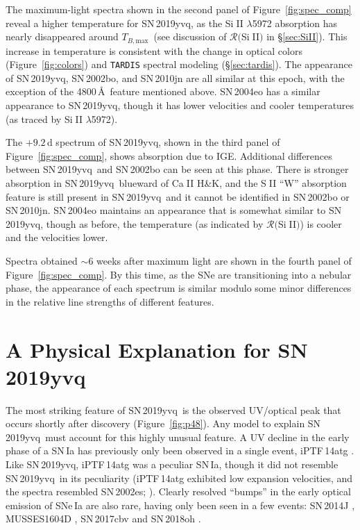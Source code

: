 \documentclass[twocolumn]{aastex63}
\def\ion#1#2{#1$\;${\footnotesize\rm{#2}}\relax}
\newcommand{\tbmax}{$T_{B,\mathrm{max}}$}
\newcommand{\RSiII}{$\mathcal{R}($\ion{Si}{II}$)$}
\newcommand{\sn}{SN\,2019yvq}
\begin{document}
The maximum-light spectra shown in the second panel of
Figure~\ref{fig:spec_comp} reveal a higher temperature for \sn, as the
\ion{Si}{II} $\lambda$5972 absorption has nearly disappeared around
\tbmax\ (see discussion of $\mathcal{R}($\ion{Si}{II}$)$ in \S\ref{sec:SiII}).
This increase in temperature is consistent with the change in optical colors
(Figure~\ref{fig:colors}) and \texttt{TARDIS} spectral modeling
(\S\ref{sec:tardis}). The appearance of \sn, SN\,2002bo, and SN\,2010jn are
all similar at this epoch, with the exception of the 4800\,\AA\ feature
mentioned above. SN\,2004eo has a similar appearance to \sn, though it has
lower velocities and cooler temperatures (as traced by \ion{Si}{II}
$\lambda$5972).

The $+9.2$\,d spectrum of \sn, shown in the third panel of
Figure~\ref{fig:spec_comp}, shows absorption due to IGE. Additional
differences between \sn\ and SN\,2002bo can be seen at this phase. There is
stronger absorption in \sn\ blueward of \ion{Ca}{II} H\&K, and the \ion{S}{II}
``W'' absorption feature is still present in \sn\ and it cannot be identified
in SN\,2002bo or SN\,2010jn. SN\,2004eo maintains an appearance that is
somewhat similar to \sn, though as before, the temperature (as indicated by
\RSiII) is cooler and the velocities lower.

Spectra obtained $\sim$6 weeks after maximum light are shown in the fourth
panel of Figure~\ref{fig:spec_comp}. By this time, as the SNe are
transitioning into a nebular phase, the appearance of each spectrum is similar
modulo some minor differences in the relative line strengths of different
features.

\section{A Physical Explanation for \sn}\label{sec:models}

The most striking feature of \sn\ is the observed UV/optical peak that occurs
shortly after discovery (Figure~\ref{fig:p48}). Any model to explain \sn\ must
account for this highly unusual feature. A UV decline in the early phase of a
SN\,Ia has previously only been observed in a single event, iPTF\,14atg
\citep{Cao15}. Like \sn, iPTF\,14atg was a peculiar SN\,Ia, though it did not
resemble \sn\ in its peculiarity (iPTF\,14atg exhibited low expansion
velocities, and the spectra resembled SN\,2002es;
\citealt{Ganeshalingam12,Cao15}). Clearly resolved ``bumps'' in the early
optical emission of SNe\,Ia are also rare, having only been seen in a few
events: SN\,2014J \citep{Goobar15}, MUSSES1604D \citep{Jiang17}, SN\,2017cbv
\citep{Hosseinzadeh17} and SN\,2018oh \citep{Shappee19,Dimitriadis19}.
\end{document}
